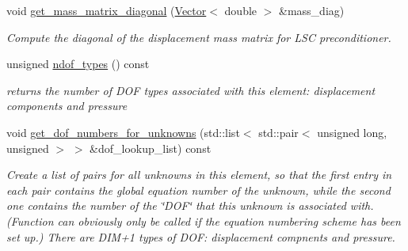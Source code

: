 \begin{DoxyCompactItemize}
void \hyperlink{classoomph_1_1PVDEquationsWithPressure_ad216a201134e2b239e3d5bcaedd56973}{get\+\_\+mass\+\_\+matrix\+\_\+diagonal} (\hyperlink{classoomph_1_1Vector}{Vector}$<$ double $>$ \&mass\+\_\+diag)
\begin{DoxyCompactList}\small\item\em Compute the diagonal of the displacement mass matrix for L\+SC preconditioner. \end{DoxyCompactList}\item 
unsigned \hyperlink{classoomph_1_1PVDEquationsWithPressure_ac7b6036faac154cd6a535ab5083c6d84}{ndof\+\_\+types} () const
\begin{DoxyCompactList}\small\item\em returns the number of D\+OF types associated with this element\+: displacement components and pressure \end{DoxyCompactList}\item 
void \hyperlink{classoomph_1_1PVDEquationsWithPressure_a46331a93e6ac8cff7b4badad1c7a7a03}{get\+\_\+dof\+\_\+numbers\+\_\+for\+\_\+unknowns} (std\+::list$<$ std\+::pair$<$ unsigned long, unsigned $>$ $>$ \&dof\+\_\+lookup\+\_\+list) const
\begin{DoxyCompactList}\small\item\em Create a list of pairs for all unknowns in this element, so that the first entry in each pair contains the global equation number of the unknown, while the second one contains the number of the \char`\"{}\+D\+O\+F\char`\"{} that this unknown is associated with. (Function can obviously only be called if the equation numbering scheme has been set up.) There are D\+I\+M+1 types of D\+OF\+: displacement compnents and pressure. \end{DoxyCompactList}\end{DoxyCompactItemize}

